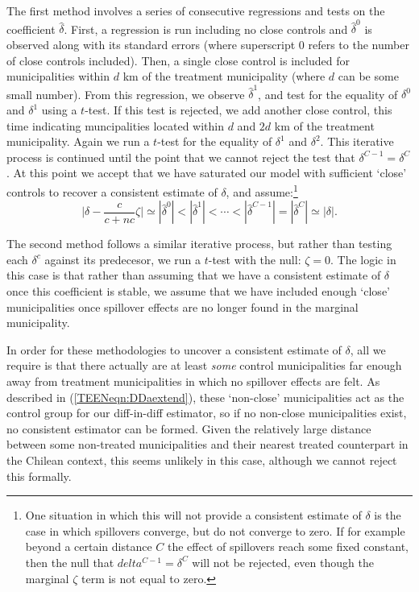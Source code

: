 The first method involves a series of consecutive regressions and tests on the
coefficient $\widehat\delta$.  First, a regression is run including no close
controls and $\hat\delta^0$ is observed along with its standard errors (where 
superscript 0 refers to the number of close controls included).  Then, a single
close control is included for municipalities within $d$ km of the treatment
municipality (where $d$ can be some small number).  From this regression, we
observe $\hat\delta^1$, and test for the equality of $\delta^0$  and $\delta^1$ 
using a $t$-test.  If this test is rejected, we add another close control, 
this time indicating muncipalities located within $d$ and $2d$ km of the 
treatment municipality.  Again we run a $t$-test for the equality of $\delta^1$ 
and $\delta^2$.  This iterative process is continued until the point that we 
cannot reject the test that $\delta^{C-1}=\delta^C$.  At this point we accept 
that we have saturated our model with sufficient `close' controls to recover 
a consistent estimate of $\delta$, and assume:\footnote{One situation in which 
this will not provide a consistent estimate of $\delta$ is the case in which 
spillovers converge, but do not converge to zero.  If for example beyond a 
certain distance $C$ the effect of spillovers reach some fixed constant, then 
the null that $delta^{C-1}=\delta^C$ will not be rejected, even though the 
marginal $\zeta$ term is not equal to zero.}
\begin{equation}
\bigg|\delta-\frac{c}{c+nc}\zeta\bigg|\simeq|\hat\delta^0|<|\hat\delta^1|<\cdots<
|\hat\delta^{C-1}|=|\hat\delta^C|\simeq|\delta|.
\end{equation}

The second method follows a similar iterative process, but rather than testing
each $\delta^c$ against its predecesor, we run a $t$-test with the null:
$\zeta=0$.  The logic in this case is that rather than assuming that we
have a consistent estimate of $\delta$ once this coefficient is stable, we
assume that we have included enough `close' municipalities once spillover effects
are no longer found in the marginal municipality.

In order for these methodologies to uncover a consistent estimate of $\delta$,
all we require is that there actually are at least \emph{some} control 
municipalities far enough away from treatment municipalities in which no 
spillover effects are felt.  As described in (\ref{TEENeqn:DDaextend}), these 
`non-close' municipalities act as the control group for our diff-in-diff estimator, 
so if no non-close municipalities exist, no consistent estimator can be formed.  
Given the relatively large distance between some non-treated municipalities and 
their nearest treated counterpart in the Chilean context, this seems unlikely in 
this case, although we cannot reject this formally.

